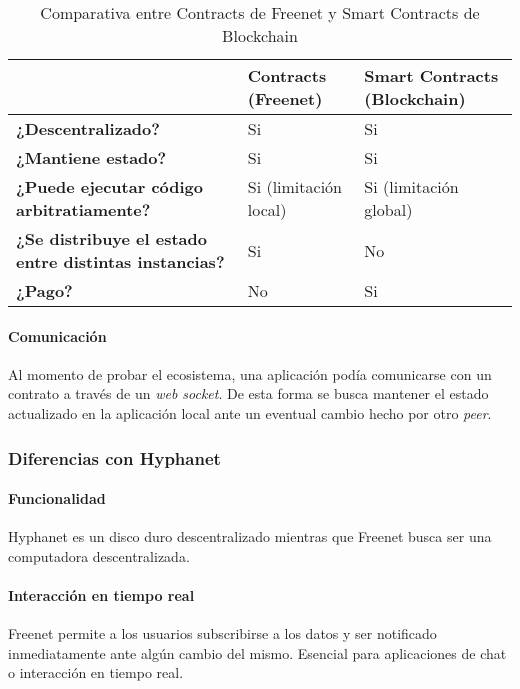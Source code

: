 \setlength\tabcolsep{3pt}
\begin{table}[H]
    \centering
    \begin{tabular}{|m{21em}|m{10em}|m{10em}|}
        \hline
         & \textbf{Contracts (Freenet)} & \textbf{Smart Contracts (Blockchain)} \\
        \hline
        \textbf{¿Descentralizado?} & Si & Si \\
        \hline
        \textbf{¿Mantiene estado?} & Si & Si \\
        \hline
        \textbf{¿Puede ejecutar código arbitratiamente?} & Si (limitación local) & Si (limitación global) \\
        \hline
        \textbf{¿Se distribuye el estado entre distintas instancias?} & Si & No \\
        \hline
        \textbf{¿Pago?} & No & Si \\
        \hline
    \end{tabular}
    \caption{Comparativa entre Contracts de Freenet y Smart Contracts de Blockchain}
    \label{tab:contracts-vs-smart-contracts}
\end{table}

\paragraph{Comunicación}

Al momento de probar el ecosistema, una aplicación podía comunicarse con un contrato a través de un \textit{web socket}. De esta forma se busca mantener el estado actualizado en la aplicación local ante un eventual cambio hecho por otro \textit{peer}.

\subsubsection{Diferencias con Hyphanet}

\paragraph{Funcionalidad} Hyphanet es un disco duro descentralizado mientras que Freenet busca ser una computadora descentralizada.

\paragraph{Interacción en tiempo real} Freenet permite a los usuarios subscribirse a los datos y ser notificado inmediatamente ante algún cambio del mismo. Esencial para aplicaciones de chat o interacción en tiempo real.

